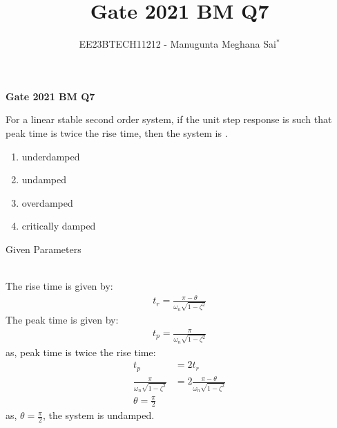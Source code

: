 \documentclass[journal,12pt,onecolumn]{IEEEtran}
\theoremstyle{remark}
\begin{document}
    
    
    \vspace{3cm}
    
    \title{Gate 2021 BM Q7}
    \author{EE23BTECH11212 - Manugunta Meghana Sai$^{*}$%
    }
    \maketitle
    \bigskip
    
    \renewcommand{\thefigure}{\theenumi}
    \renewcommand{\thetable}{\theenumi}
    
    \vspace{3cm}
    \textbf{Gate 2021 BM Q7} 
    
    For a linear stable second order system, if the unit step response is such that peak time is twice the rise time, then the system is . 
    \begin{enumerate}
    \item underdamped\\
    \item undamped\\
    \item overdamped\\
    \item critically damped\\
    \end{enumerate}
    \solution
    \begin{table}[h!]
 	\centering
 	\resizebox{6 cm}{!}{
 		
 	}
 	\caption{Given Parameters}
 	\label{tab:msmBMgate8tab1}
     \end{table} 
    \\The rise time is given by:
    \begin{align}
    t_{r} = \frac{\pi-\theta}{\omega_{n} \sqrt{1-\zeta^{2}}}
    \end{align}
    The peak time is given by:
    \begin{align}
    t_{p} = \frac{\pi}{\omega_{n} \sqrt{1-\zeta^{2}}}
    \end{align}
    as, peak time is twice the rise time:
    \begin{align}
    t_{p} &= 2t_{r}\\
    \frac{\pi}{\omega_{n} \sqrt{1-\zeta^{2}}} &= 2\frac{\pi-\theta}{\omega_{n} \sqrt{1-\zeta^{2}}}\\
    \theta = \frac{\pi}{2}
    \end{align}
    as, $\theta = \frac{\pi}{2}$, the system is undamped.
\end{document}
